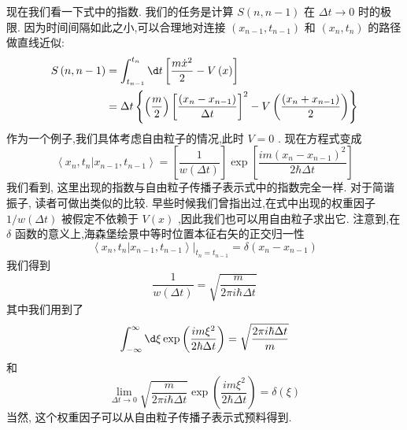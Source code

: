 \documentclass[lang=cn,newtx,10pt,scheme=chinese,thmcnt=section]{elegantbook}
\begin{document}
现在我们看一下式中的指数. 我们的任务是计算 $S\left( {n, n - 1}\right)$ 在 ${\Delta t} \rightarrow 0$ 时的极限. 因为时间间隔如此之小,可以合理地对连接 $\left( {{x}_{n - 1},{t}_{n - 1}}\right)$ 和 $\left( {{x}_{n},{t}_{n}}\right)$ 的路径做直线近似:
\begin{equation}
	\begin{aligned}
		S\left( {n, n - 1}\right) &= \int_{{t}_{n - 1}}^{{t}_{n}}{\d t}\left\lbrack {\frac{m{\dot{x}}^{2}}{2} - V\left( x\right) }\right\rbrack\\
		&= {\Delta t}\left\{ {\left( \frac{m}{2}\right) {\left\lbrack \frac{\left( {x}_{n} - {x}_{n - 1}\right) }{\Delta t}\right\rbrack }^{2} - V\left( \frac{\left( {x}_{n} + {x}_{n - 1}\right) }{2}\right) }\right\}
	\end{aligned}
\end{equation}
作为一个例子,我们具体考虑自由粒子的情况,此时 $V = 0$ . 现在方程式变成
\begin{equation}
	\left\langle {{x}_{n},{t}_{n} | {x}_{n - 1},{t}_{n - 1}}\right\rangle = \left\lbrack \frac{1}{w\left( {\Delta t}\right) }\right\rbrack \exp \left\lbrack \frac{{im}{\left( {x}_{n} - {x}_{n - 1}\right) }^{2}}{2\hbar {\Delta t}}\right\rbrack
\end{equation}
我们看到, 这里出现的指数与自由粒子传播子表示式中的指数完全一样. 对于简谐振子, 读者可做出类似的比较.
早些时候我们曾指出过,在式中出现的权重因子 $1/w\left( {\Delta t}\right)$ 被假定不依赖于 $V\left( x\right)$ ,因此我们也可以用自由粒子求出它. 注意到,在 $\delta$ 函数的意义上,海森堡绘景中等时位置本征右矢的正交归一性
\begin{equation}
	\left\langle {{x}_{n},{t}_{n} | {x}_{n - 1},{t}_{n - 1}}\right\rangle {\left. \right| }_{{t}_{n} = {t}_{n - 1}} = \delta \left( {{x}_{n} - {x}_{n - 1}}\right)
\end{equation}
我们得到
\begin{equation}
	\frac{1}{w\left( {\Delta t}\right) } = \sqrt{\frac{m}{{2\pi i}\hbar {\Delta t}}}
\end{equation}
其中我们用到了
\begin{equation}
	\int_{-\infty }^{\infty }{\d \xi }\exp \left( \frac{{im}{\xi }^{2}}{2\hbar {\Delta t}}\right) = \sqrt{\frac{{2\pi i}\hbar {\Delta t}}{m}}
\end{equation}
和
\begin{equation}
	\mathop{\lim }\limits_{{{\Delta t} \rightarrow 0}}\sqrt{\frac{m}{{2\pi i}\hbar {\Delta t}}}\exp \left( \frac{{im}{\xi }^{2}}{2\hbar {\Delta t}}\right) = \delta \left( \xi \right)
\end{equation}
当然, 这个权重因子可以从自由粒子传播子表示式预料得到.
\end{document}
